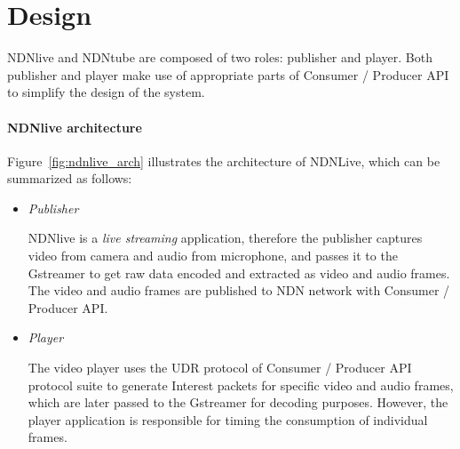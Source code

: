\vspace{0.3cm}
\section{Design} %
\label{sec:arch}
NDNlive and NDNtube are composed of two roles: publisher and player. Both publisher and player make use of appropriate parts of Consumer / Producer API to simplify the design of the system.

\paragraph{NDNlive architecture} %
\vspace{0.3cm}
\label{par:ndnlive_arch}
Figure~\ref{fig:ndnlive_arch} illustrates the architecture of NDNLive, which can be summarized as follows:

\begin{itemize}
  \item \textit{Publisher}

  NDNlive is a \textit{live streaming} application, therefore the publisher captures video from camera and audio from microphone, and passes it to the Gstreamer to get raw data encoded and extracted as video and audio frames. The video and audio frames are published to NDN network with Consumer / Producer API. 

  \item \textit{Player}

  The video player uses the UDR protocol of Consumer / Producer API protocol suite to generate Interest packets for specific video and audio frames, which are later passed to the Gstreamer for decoding purposes. However, the player application is responsible for timing the consumption of individual frames.

\end{itemize}



